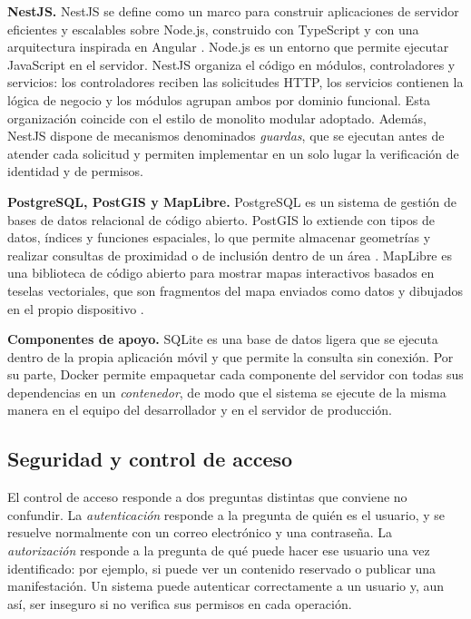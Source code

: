 \textbf{NestJS.} NestJS se define como un marco para construir aplicaciones de servidor eficientes y escalables sobre Node.js, construido con TypeScript y con una arquitectura inspirada en Angular \cite{nestjs2026docs}. Node.js es un entorno que permite ejecutar JavaScript en el servidor. NestJS organiza el código en módulos, controladores y servicios: los controladores reciben las solicitudes HTTP, los servicios contienen la lógica de negocio y los módulos agrupan ambos por dominio funcional. Esta organización coincide con el estilo de monolito modular adoptado. Además, NestJS dispone de mecanismos denominados \textit{guardas}, que se ejecutan antes de atender cada solicitud y permiten implementar en un solo lugar la verificación de identidad y de permisos.

\textbf{PostgreSQL, PostGIS y MapLibre.} PostgreSQL es un sistema de gestión de bases de datos relacional de código abierto. PostGIS lo extiende con tipos de datos, índices y funciones espaciales, lo que permite almacenar geometrías y realizar consultas de proximidad o de inclusión dentro de un área \cite{postgis2026docs}. MapLibre es una biblioteca de código abierto para mostrar mapas interactivos basados en teselas vectoriales, que son fragmentos del mapa enviados como datos y dibujados en el propio dispositivo \cite{maplibre2026docs}.

\textbf{Componentes de apoyo.} SQLite es una base de datos ligera que se ejecuta dentro de la propia aplicación móvil y que permite la consulta sin conexión. Por su parte, Docker permite empaquetar cada componente del servidor con todas sus dependencias en un \textit{contenedor}, de modo que el sistema se ejecute de la misma manera en el equipo del desarrollador y en el servidor de producción.

\subsection{Seguridad y control de acceso}
El control de acceso responde a dos preguntas distintas que conviene no confundir. La \textit{autenticación} responde a la pregunta de quién es el usuario, y se resuelve normalmente con un correo electrónico y una contraseña. La \textit{autorización} responde a la pregunta de qué puede hacer ese usuario una vez identificado: por ejemplo, si puede ver un contenido reservado o publicar una manifestación. Un sistema puede autenticar correctamente a un usuario y, aun así, ser inseguro si no verifica sus permisos en cada operación.

